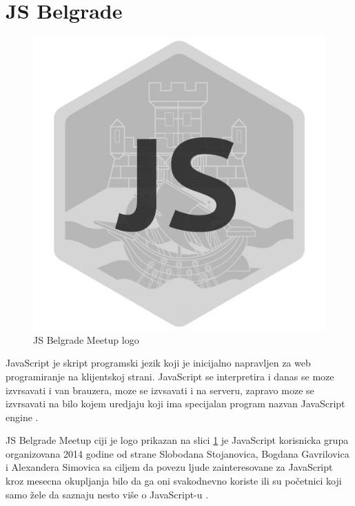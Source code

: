 \documentclass[a4paper]{article}
\begin{document}
{\section{JS Belgrade}
\label{sec:JSBM}

\begin{figure}[h!]
\begin{center}
\includegraphics[scale=0.25]{JS_logo.png}
\end{center}
\caption{JS Belgrade Meetup logo}
\label{fig:JS_slika}
\end{figure}

JavaScript je skript programski jezik koji je inicijalno napravljen za web programiranje na klijentskoj strani. JavaScript se interpretira i danas se moze izvrsavati i van brauzera, moze se izvsavati i na serveru, zapravo moze se izvrsavati na bilo kojem uredjaju koji ima specijalan program nazvan JavaScript engine \cite{aboutJS}. 

JS Belgrade Meetup ciji je logo prikazan na slici \ref{fig:JS_slika} je JavaScript korisnicka grupa organizovana 2014 godine od strane Slobodana Stojanovica, Bogdana Gavrilovica i Alexandera Simovica sa ciljem da povezu ljude zainteresovane za JavaScript kroz mesecna okupljanja bilo da ga oni svakodnevno koriste ili su početnici koji samo žele da saznaju nesto više o JavaScript-u \cite{JS_Belgrade_meetup_pocetna}. 

}
\end{document}
